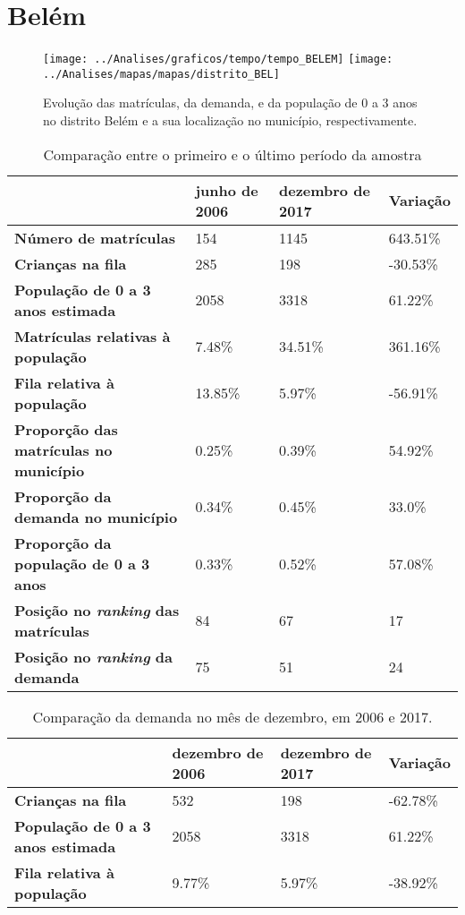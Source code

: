 \section{Belém}
\begin{figure}[H]
	\centering
	\texttt{[image: ../Analises/graficos/tempo/tempo\_BELEM]}
	\texttt{[image: ../Analises/mapas/mapas/distrito\_BEL]}
	\caption{Evolução das matrículas, da demanda, e da população de 0 a 3 anos no distrito Belém e a sua localização no município, respectivamente.}
\end{figure}
\begin{table}[H]
	\begin{tabular}{|l|l|l|l|}
		\hline
		\textbf{}                                      & \textbf{junho de 2006}       & \textbf{dezembro de 2017}    & \textbf{Variação} \\ \hline
		\textbf{Número de matrículas}                  & 154 & 1145 & 643.51\% \\ \hline
		\textbf{Crianças na fila}                      & 285 & 198 & -30.53\% \\ \hline
		\textbf{População de 0 a 3 anos estimada}      & 2058 & 3318 & 61.22\% \\ \hline
		\textbf{Matrículas relativas à população}      & 7.48\% & 34.51\% & 361.16\% \\ \hline
		\textbf{Fila relativa à população}             & 13.85\% & 5.97\% & -56.91\% \\ \hline
		\textbf{Proporção das matrículas no município} & 0.25\% & 0.39\% & 54.92\% \\ \hline
		\textbf{Proporção da demanda no município}     & 0.34\% & 0.45\% & 33.0\% \\ \hline
		\textbf{Proporção da população de 0 a 3 anos}  & 0.33\% & 0.52\% & 57.08\% \\ \hline
		\textbf{Posição no \textit{ranking} das matrículas}     & 84 & 67 & 17 \\ \hline
		\textbf{Posição no \textit{ranking} da demanda}         & 75 & 51 & 24 \\ \hline
	\end{tabular}
	\caption{Comparação entre o primeiro e o último período da amostra}
\end{table}
\begin{table}[H]
	\begin{tabular}{|l|l|l|l|}
		\hline
		\textbf{}                                 & \textbf{dezembro de 2006} & \textbf{dezembro de 2017} & \textbf{Variação} \\ \hline
		\textbf{Crianças na fila}                      & 532 & 198 & -62.78\% \\ \hline
		\textbf{População de 0 a 3 anos estimada}      & 2058 & 3318 & 61.22\% \\ \hline
		\textbf{Fila relativa à população}             & 9.77\% & 5.97\% & -38.92\% \\ \hline
	\end{tabular}
	\caption{Comparação da demanda no mês de dezembro, em 2006 e 2017.}
\end{table}
